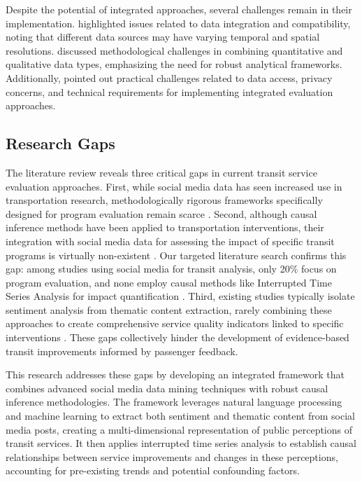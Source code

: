 \documentclass[a4paper,fleqn,12pt]{cas-sc}
\begin{document}
Despite the potential of integrated approaches, several challenges remain in their implementation. \cite{tse2018social} highlighted issues related to data integration and compatibility, noting that different data sources may have varying temporal and spatial resolutions. \cite{nguyen2016transportation} discussed methodological challenges in combining quantitative and qualitative data types, emphasizing the need for robust analytical frameworks. Additionally, \cite{zhang2019examining} pointed out practical challenges related to data access, privacy concerns, and technical requirements for implementing integrated evaluation approaches.

\subsection{Research Gaps}
The literature review reveals three critical gaps in current transit service evaluation approaches. First, while social media data has seen increased use in transportation research, methodologically rigorous frameworks specifically designed for program evaluation remain scarce \citep{schweitzer2012social, zhang2019examining}. Second, although causal inference methods have been applied to transportation interventions, their integration with social media data for assessing the impact of specific transit programs is virtually non-existent \citep{hong2020causal, ye2020causal}. Our targeted literature search confirms this gap: among studies using social media for transit analysis, only 20\% focus on program evaluation, and none employ causal methods like Interrupted Time Series Analysis for impact quantification \citep{mathur2021exploratory, liu2017monitoring}. Third, existing studies typically isolate sentiment analysis from thematic content extraction, rarely combining these approaches to create comprehensive service quality indicators linked to specific interventions \citep{collins2013social, luong2015mining}. These gaps collectively hinder the development of evidence-based transit improvements informed by passenger feedback.

This research addresses these gaps by developing an integrated framework that combines advanced social media data mining techniques with robust causal inference methodologies. The framework leverages natural language processing and machine learning to extract both sentiment and thematic content from social media posts, creating a multi-dimensional representation of public perceptions of transit services. It then applies interrupted time series analysis to establish causal relationships between service improvements and changes in these perceptions, accounting for pre-existing trends and potential confounding factors.
\end{document}
